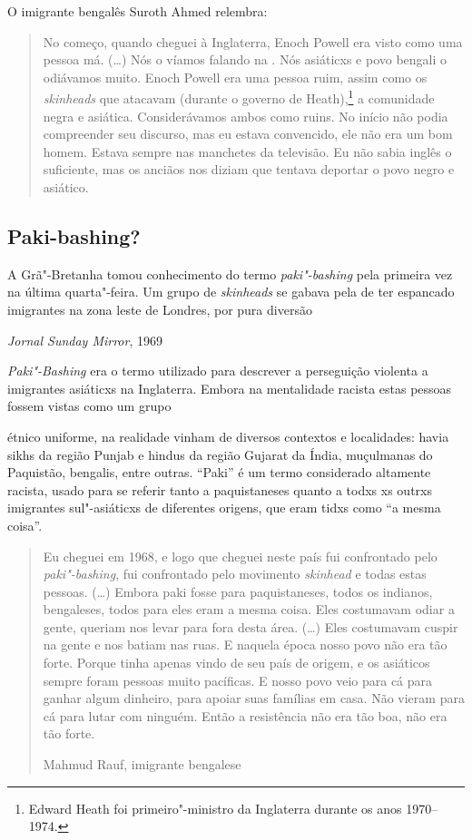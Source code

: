O imigrante bengalês Suroth Ahmed relembra:

\begin{quote}
No começo, quando cheguei à Inglaterra, Enoch Powell era visto como uma pessoa má. (\ldots{}) Nós o víamos falando na . Nós asiáticxs e povo bengali o odiávamos muito. Enoch Powell era uma pessoa ruim, assim como os \emph{skinheads} que atacavam (durante o governo de Heath),\footnote{Edward Heath foi primeiro"-ministro da Inglaterra durante os anos 1970--1974.} a comunidade negra e asiática. Considerávamos ambos como ruins. No início não podia compreender seu discurso, mas eu estava convencido, ele não era um bom homem. Estava sempre nas manchetes da televisão. Eu não sabia inglês o suficiente, mas os anciãos nos diziam que tentava deportar o povo negro e asiático.
\end{quote}



\subsection{Paki-bashing?}

\epigraph{A Grã"-Bretanha tomou conhecimento do termo \emph{paki"-bashing} pela primeira vez na última quarta"-feira. Um grupo de \emph{skinheads} se gabava pela  de ter espancado imigrantes na zona leste de Londres, por pura diversão}{\textit{Jornal Sunday Mirror}, 1969}

\emph{Paki"-Bashing} era o termo utilizado para descrever a perseguição violenta a imigrantes 
asiáticxs na Inglaterra. Embora na mentalidade racista estas pessoas fossem vistas como um grupo \linebreak

\noindent{}étnico uniforme, na realidade vinham de diversos contextos e localidades: havia sikhs
da região Punjab e hindus da região Gujarat da Índia, muçulmanas do Paquistão, bengalis, entre outras. ``Paki'' é um termo considerado altamente racista, usado para se referir tanto a paquistaneses quanto a todxs xs outrxs imigrantes sul"-asiáticxs de diferentes origens, que eram tidxs como ``a mesma coisa''.

\begin{quote}
Eu cheguei em 1968, e logo que cheguei neste país fui confrontado pelo \emph{paki"-bashing}, fui confrontado pelo movimento \emph{skinhead} e todas estas pessoas. (\ldots{}) Embora paki fosse para paquistaneses, todos os indianos, bengaleses, todos para eles eram a mesma coisa. Eles costumavam odiar a gente, queriam nos levar para fora desta área. (\ldots{}) Eles costumavam cuspir na gente e nos batiam nas ruas. E naquela época nosso povo não era tão forte. Porque tinha apenas vindo de seu país de origem, e os asiáticos sempre foram pessoas muito pacíficas. E nosso povo veio para cá para ganhar algum dinheiro, para apoiar suas famílias em casa. Não vieram para cá para lutar com ninguém. Então a resistência não era tão boa, não era tão forte.

Mahmud Rauf, imigrante bengalese
\end{quote}

